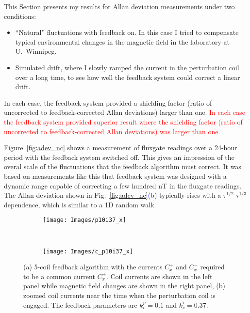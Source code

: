 
This Section presents my results for Allan deviation measurements
under two conditions:
\begin{itemize}
\item ``Natural'' fluctuations with feedback on.  In this case I tried to compensate typical environmental changes in the magnetic field in the laboratory at U.~Winnipeg.
\item Simulated drift, where I slowly ramped the current in the perturbation coil over a long time, to see how well the feedback system could correct a linear drift.
\end{itemize}

In each case, the feedback system provided a shielding factor (ratio of uncorrected to feedback-corrected Allan deviations) larger than one.
\textcolor{red}{In each case the feedback system provided superior result where the
shielding factor (ratio of uncorrected to feedback-corrected Allan
deviations) was larger than one.}


Figure~\ref{fig:adev_nc} shows a measurement of fluxgate readings over
a 24-hour period with the feedback system switched off.  This gives an
impression of the overal scale of the fluctuations that the feedback
algorithm must correct.  It was based on measurements like this that
feedback system was designed with a dynamic range capable of
correcting a few hundred nT in the fluxgate readings.  The Allan
deviation shown in Fig.~\ref{fig:adev_nc}\textcolor{blue}{(b)} typically rises with a
$\tau^{1/2}$-$\tau^{1/3}$ dependence, which is similar to a 1D random
walk.


\begin{figure}
     \begin{subfigure}{\textwidth} \centering \texttt{[image: Images/p10i37\_x]} \caption{}  \label{fig:1} \end{subfigure}\\[1ex] \begin{subfigure}{\textwidth} \centering \texttt{[image: Images/c\_p10i37\_x]} \caption{} \label{fig:2} \end{subfigure}
\caption[5-coil feedback algorithm with zoomed coil currents]{(a) 5-coil feedback algorithm with the currents $C_x^+$ and $C_x^-$ required to be a common current $C_x^\pm$. Coil currents are shown in the left panel while magnetic field changes are shown  in the right panel, (b) zoomed coil currents near the time when the perturbation coil is engaged. The feedback parameters are $k_c^p=0.1$ and $k_c^i=0.37$.}
    \label{fig:p10_i37_x}
\end{figure}

